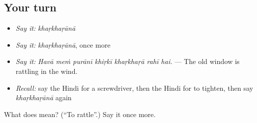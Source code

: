 \subsection*{Your turn}
\begin{itemize}
\raggedright
  \item \emph{Say it:} \emph{khaṛkhaṛānā}
  \item \emph{Say it:} \emph{khaṛkhaṛānā}, once more
  \item \emph{Say it:} \emph{Havā meṁ purānī khiṛkī khaṛkhaṛā rahī hai.} — The old window is rattling in the wind.
  \item \emph{Recall:} say the Hindi for a screwdriver, then the Hindi for to tighten, then say \emph{khaṛkhaṛānā} again
\end{itemize}

\begin{tcolorbox}[breakable,colback=teal!4,colframe=teal!35!black,title={Before you move on}]
What does  mean? (\textquotedblleft{}To rattle\textquotedblright{}.) Say it once more.
\end{tcolorbox}
